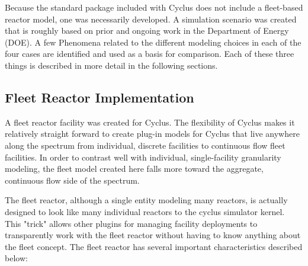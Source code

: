\documentclass{style}
\begin{document}
Because the standard package included with Cyclus does not include a
fleet-based reactor model, one was necessarily developed. A simulation
scenario was created that is roughly based on prior and ongoing work in the
Department of Energy (DOE).  A few Phenomena related to the different modeling
choices in each of the four cases are identified and used as a basis for
comparison.  Each of these three things is described in more detail in the
following sections.

\subsection{Fleet Reactor Implementation}

A fleet reactor facility was created for Cyclus.  The flexibility of Cyclus
makes it relatively straight forward to create plug-in models for Cyclus that
live anywhere along the spectrum from individual, discrete facilities to
continuous flow fleet facilities.  In order to contrast well with individual,
single-facility granularity modeling, the fleet model created here falls more
toward the aggregate, continuous flow side of the spectrum.  

The fleet reactor, although a single entity modeling many reactors, is
actually designed to look like many individual reactors to the cyclus
simulator kernel. This "trick" allows other plugins for managing facility
deployments to transparently work with the fleet reactor without having to
know anything about the fleet concept.  The fleet reactor has several
important characteristics described below:
\end{document}
